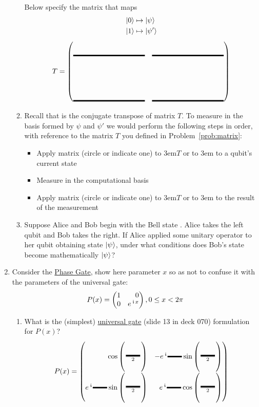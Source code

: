 \documentclass[12pt]{article}
\begin{document}
\begin{enumerate}
\begin{enumerate}[label=\theenumi.\arabic*]
Below specify the matrix that maps
\begin{align*}
    \ket{0} &\mapsto \ket{\psi} \\
    \ket{1} &\mapsto \ket{\psi'}
\end{align*}
\[
T = \begin{pmatrix*}[r]
\Blank[10em]{} & \Blank[10em]{} \\[4em]
\Blank[10em]{} & \Blank[10em]{}
\end{pmatrix*}
\]
\item Recall that  is the conjugate transpose of matrix $T$.  To measure in the basis formed by $\psi$ and $\psi'$ we would perform the following steps in order, with reference to the matrix $T$ you defined in Problem~\ref{prob:matrix}:
\begin{itemize}
    \item Apply matrix (circle or indicate one) \hbox to 3em{\hss$T$\hss} or \hbox to 3em{\hss{}\hss}  to a qubit's current state
    \item Measure in the computational basis
    \item Apply matrix (circle or indicate one) \hbox to 3em{\hss$T$\hss} or \hbox to 3em{\hss{}\hss}  to the result of the measurement
\end{itemize}
\item Suppose Alice and Bob begin with the Bell state . Alice takes the left qubit and Bob takes the right. If Alice applied some unitary operator  to her qubit obtaining state $\ket{\psi_{}}$, under what conditions does Bob's state become mathematically $\ket{\psi_{}}$?
\LeaveSpace{}
\end{enumerate}
\item\label{prob:phasegate} Consider the \href{https://docs.quantum.ibm.com/api/qiskit/qiskit.circuit.library.PhaseGate}{Phase Gate}, show here parameter $x$ so as not to confuse it with the parameters of the universal  gate:
\[
P(x) = \SQBG{\relax}{1}{0}{0}{\ExpPhase{x}}, 0\leq x < 2\pi
\]
\begin{enumerate}[label=\theenumi.\arabic*]
  \item What is the (simplest) \href{https://docs.quantum.ibm.com/api/qiskit/qiskit.circuit.library.U3Gate}{universal gate} (slide 13 in deck 070) formulation for $P(x)$?
  \[
  P(x) = \SQBG{\relax}{\cos{\left(\frac{\Blank[2em]}{2}\right)}}{-\ExpPhase{\Blank[2em]}\sin{\left(\frac{\Blank[2em]}{2}\right)}}{\ExpPhase{\Blank[2em]}\sin{\left(\frac{\Blank[2em]}{2}\right)}}{\ExpPhase{\Blank[2em]}\cos{\left(\frac{\Blank[2em]}{2}\right)}}
\]
\end{enumerate}
\end{enumerate}
\end{document}
